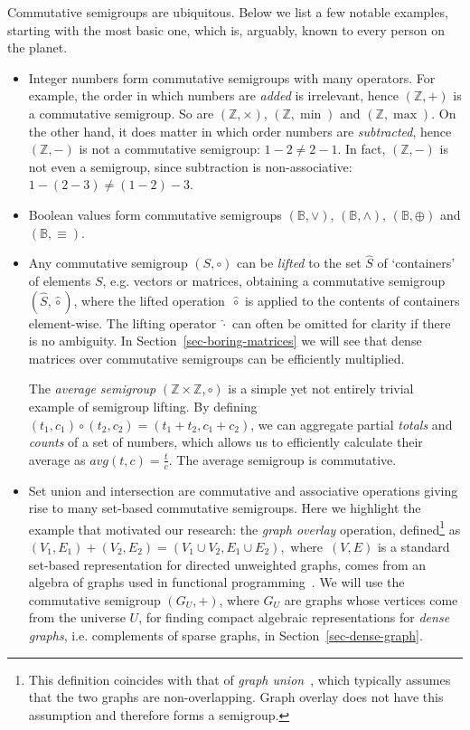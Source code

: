\documentclass[11pt,letterpaper]{article}
\begin{document}
Commutative semigroups are ubiquitous. Below we list a few
notable examples, starting with the most basic one, which is, arguably, known
to every person on the planet.

\begin{itemize}
  \item Integer numbers form commutative semigroups with many operators. For
  example, the order in which numbers are \emph{added} is irrelevant, hence
  $(\mathbb{Z}, +)$ is a commutative semigroup. So are $(\mathbb{Z}, \times)$,
  $(\mathbb{Z}, \min)$ and $(\mathbb{Z}, \max)$. On the other hand, it does
  matter in which order numbers are \emph{subtracted}, hence $(\mathbb{Z}, -)$
  is not a commutative semigroup: $1-2 \neq 2-1$. In fact, $(\mathbb{Z}, -)$
  is not even a semigroup, since subtraction is non-associative:
  $1-(2-3) \neq (1-2)-3$.

  \item Boolean values form commutative semigroups $(\mathbb{B}, \vee)$,
  $(\mathbb{B}, \wedge)$, $(\mathbb{B}, \oplus)$ and $(\mathbb{B}, \equiv)$.

  \item Any commutative semigroup $(S, \circ)$ can be \emph{lifted} to the set
  $\hat{S}$ of `containers' of elements $S$, e.g. vectors or matrices,
  obtaining a commutative semigroup $(\hat{S}, \hat{\circ})$, where the lifted
  operation~$\hat{\circ}$ is applied to the contents of containers element-wise.
  The lifting operator $\hat{\cdot}$ can often be omitted for clarity if there
  is no ambiguity. In Section~\ref{sec-boring-matrices} we will see that dense
  matrices over commutative semigroups can be efficiently multiplied.

  The \emph{average semigroup} $(\mathbb{Z} \times \mathbb{Z}, \circ)$ is a
  simple yet not entirely trivial example of semigroup lifting. By defining
  $(t_1, c_1) \circ (t_2, c_2) = (t_1 + t_2, c_1 + c_2)$, we can aggregate
  partial \emph{totals} and \emph{counts} of a set of numbers, which allows us
  to efficiently calculate their average as $\textit{avg}(t, c) = \frac{t}{c}$.
  The average semigroup is commutative.

  \item Set union and intersection are commutative and associative operations
  giving rise to many set-based commutative semigroups. Here we highlight the
  example that motivated our research: the \emph{graph overlay} operation,
  defined\footnote{This definition coincides with that of
  \emph{graph union}~\cite{1969_graph_theory_harary}, which typically
  assumes that the two graphs are non-overlapping. Graph overlay does not have
  this assumption and therefore forms a semigroup.} as
  $(V_1, E_1) + (V_2, E_2) = (V_1 \cup V_2, E_1 \cup E_2)$,~where~$(V, E)$ is
  a standard set-based representation for directed unweighted graphs, comes from
  an algebra of graphs used in functional programming~\cite{mokhov2017algebraic}.
  We will use the commutative semigroup $(G_U,+)$, where $G_U$ are graphs whose
  vertices come from the universe $U$, for finding compact algebraic
  representations for \emph{dense graphs}, i.e. complements of sparse graphs,
  in Section~\ref{sec-dense-graph}.
\end{itemize}
\end{document}
